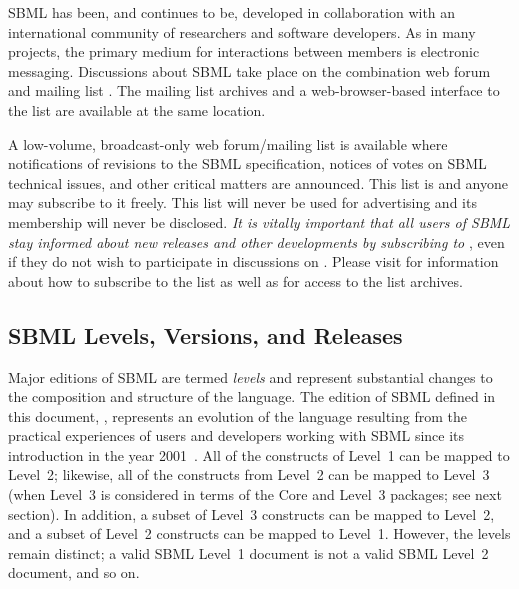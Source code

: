 SBML has been, and continues to be, developed in collaboration
with an international community of researchers and software
developers.  As in many projects, the primary medium for
  interactions between members is electronic messaging.
Discussions about SBML take place on the combination web
  forum and mailing list
.
The mailing list archives and a web-browser-based interface to the
list are available at the same location.

A low-volume, broadcast-only web forum/mailing list is
available where notifications of revisions to the SBML
speci\-fication, notices of votes on SBML technical issues, and
other critical matters are announced.  This list is
and anyone may subscribe to it freely.  This list will never be
used for advertising and its membership will never be
disclosed.  \emph{It is vitally important that all users of SBML
  stay informed about new releases and other developments by
  subscribing to
  },
even if they do not wish to participate in discussions on
  .
Please visit
for information about how to subscribe to the list as
well as for access to the list archives.


\subsection{SBML Levels, Versions, and Releases}
\label{sec:levels-versions-releases}

Major editions of SBML are termed \emph{levels} and represent
substantial changes to the composition and structure of the
language.  The edition of SBML defined in this document,
\sbmlthree, represents an evolution of the language resulting from
the practical experiences of users and developers working with
SBML since its introduction in the year
2001~\citep{hucka:2001,hucka:2003}.  All of the constructs of
Level~1 can be mapped to Level~2; likewise, all of the constructs
from Level~2 can be mapped to Level~3 (when Level~3 is considered
in terms of the Core and Level~3 packages; see next section).  In
addition, a subset of Level~3 constructs can be mapped to Level~2,
and a subset of Level~2 constructs can be mapped to Level~1.
However, the levels remain distinct; a valid SBML Level~1 document
is not a valid SBML Level~2 document, and so on.

